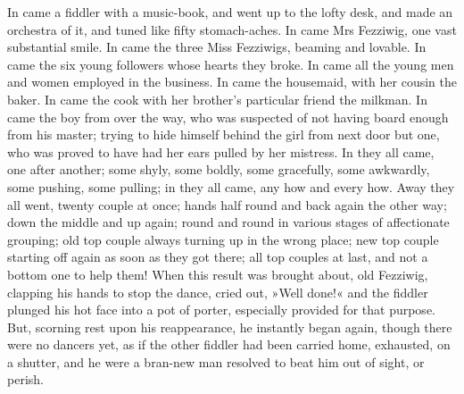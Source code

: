 In came a fiddler with a music-book, and went up to the lofty desk, and made an orchestra of it, and tuned like fifty stomach-aches. In came Mrs Fezziwig, one vast substantial smile. In came the three Miss Fezziwigs, beaming and lovable. In came the six young followers whose hearts they broke. In came all the young men and women employed in the business. In came the housemaid, with her cousin the baker. In came the cook with her broth\-er's particular friend the milkman. In came the boy from over the way, who was suspected of not having board enough from his master; trying to hide himself behind the girl from next door but one, who was proved to have had her ears pulled by her mistress. In they all came, one after another; some shyly, some boldly, some gracefully, some awkwardly, some pushing, some pulling; in they all came, any how and every how. Away they all went, twenty couple at once; hands half round and back again the other way; down the middle and up again; round and round in various stages of affectionate grouping; old top couple always turning up in the wrong place; new top couple starting off again as soon as they got there; all top couples at last, and not a bottom one to help them! When this result was brought about, old Fezziwig, clapping his hands to stop the dance, cried out, »Well done!« and the fiddler plunged his hot face into a pot of porter, especially provided for that purpose. But, scorning rest upon his reappearance, he instantly began again, though there were no dancers yet, as if the other fiddler had been carried home, exhausted, on a shutter, and he were a bran-new man resolved to beat him out of sight, or perish.

